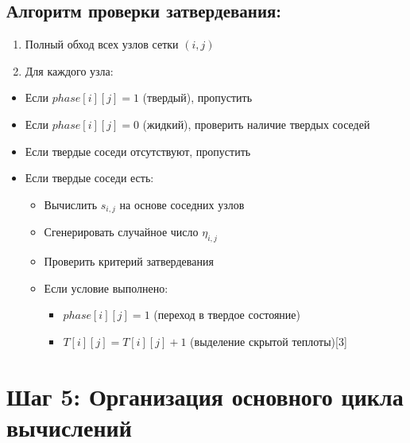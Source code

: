 \documentclass[
  12pt,
  a4paper,
  DIV=11,
  numbers=noendperiod]{scrreprt}
\providecommand{\tightlist}{%
  \setlength{\itemsep}{0pt}\setlength{\parskip}{0pt}}\usepackage{longtable,booktabs,array}
\begin{document}
\subsection{Алгоритм проверки
затвердевания:}\label{ux430ux43bux433ux43eux440ux438ux442ux43c-ux43fux440ux43eux432ux435ux440ux43aux438-ux437ux430ux442ux432ux435ux440ux434ux435ux432ux430ux43dux438ux44f}

\begin{enumerate}
\def\labelenumi{\arabic{enumi}.}
\item
  Полный обход всех узлов сетки \((i, j)\)
\item
  Для каждого узла:
\end{enumerate}

\begin{itemize}
\tightlist
\item
  Если \(phase[i][j] = 1\) (твердый), пропустить
\item
  Если \(phase[i][j] = 0\) (жидкий), проверить наличие твердых соседей
\item
  Если твердые соседи отсутствуют, пропустить
\item
  Если твердые соседи есть:

  \begin{itemize}
  \tightlist
  \item
    Вычислить \(s_{i,j}\) на основе соседних узлов
  \item
    Сгенерировать случайное число \(\eta_{i,j}\)
  \item
    Проверить критерий затвердевания
  \item
    Если условие выполнено:

    \begin{itemize}
    \tightlist
    \item
      \(phase[i][j] = 1\) (переход в твердое состояние)
    \item
      \(T[i][j] = T[i][j] + 1\) (выделение скрытой теплоты){[}3{]}
    \end{itemize}
  \end{itemize}
\end{itemize}

\section{Шаг 5: Организация основного цикла
вычислений}\label{ux448ux430ux433-5-ux43eux440ux433ux430ux43dux438ux437ux430ux446ux438ux44f-ux43eux441ux43dux43eux432ux43dux43eux433ux43e-ux446ux438ux43aux43bux430-ux432ux44bux447ux438ux441ux43bux435ux43dux438ux439}
\end{document}
